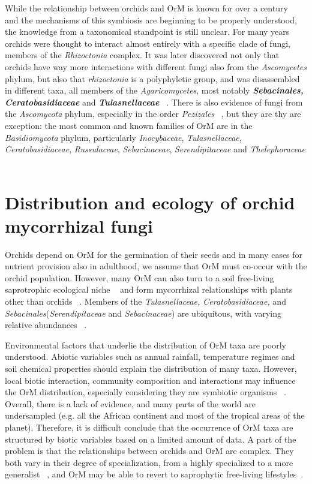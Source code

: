 While the relationship between orchids and OrM is known for over a century ~\citep{bernard1899, rayner1927, rasmussen2002, selosse2011} and the mechanisms of this symbiosis are beginning to be properly understood, the knowledge from a taxonomical standpoint is still unclear. For many years orchids were thought to interact almost entirely with a specific clade of fungi, members of the \emph{Rhizoctonia} complex. It was later discovered not only that orchids have way more interactions with different fungi also from the \emph{Ascomycetes} phylum, but also that \emph{rhizoctonia} is a polyphyletic group, and was disassembled in different taxa, all members of the \emph{Agaricomycetes}, most notably \textbf{\emph{Sebacinales, Ceratobasidiaceae}} and \textbf{\emph{Tulasnellaceae}} ~\citep{dearnaley2012}.
There is also evidence of fungi from the \emph{Ascomycota} phylum, especially in the order \emph{Pezizales} ~\citep{selosse2004, ouanphanivanh2008, waterman2011}, but they are thy are exception: the most common and known families of OrM are in the \emph{Basidiomycota} phylum, particularly \emph{Inocybaceae}, \emph{Tulasnellaceae}, \emph{Ceratobasidiaceae}, \emph{Russulaceae}, \emph{Sebacinaceae}, \emph{Serendipitaceae} and \emph{Thelephoraceae} ~\citep{taylor2004, roy2009, duffy2019}

\section{Distribution and ecology of orchid mycorrhizal fungi}
\label{distributionandecologyoforchidmycorrhizalfungi}

Orchids depend on OrM for the germination of their seeds and in many cases for nutrient provision also in adulthood, we assume that OrM must co-occur with the orchid population. However, many OrM can also turn to a soil free-living saprotrophic ecological niche ~\citep{oberwinkler2017} and form mycorrhizal relationships with plants other than orchids ~\citep{selosse2014}. Members of the \emph{Tulasnellaceae, Ceratobasidiaceae,} and \emph{Sebacinales}(\emph{Serendipitaceae} and \emph{Sebacinaceae}) are ubiquitous, with varying relative abundances ~\citep{jacquemyn2017}.

Environmental factors that underlie the distribution of OrM taxa are poorly understood. Abiotic variables such as annual rainfall, temperature regimes and soil chemical properties should explain the distribution of many taxa. However, local biotic interaction, community composition and interactions may influence the OrM distribution, especially considering they are symbiotic organisms ~\citep{jacquemyn2017}. Overall, there is a lack of evidence, and many parts of the world are undersampled (e.g. all the African continent and most of the tropical areas of the planet). Therefore, it is difficult conclude that the occurrence of OrM taxa are structured by biotic variables based on a limited amount of data. A part of the problem is that the relationships between orchids and OrM are complex. They both vary in their degree of specialization, from a highly specialized to a more generalist ~\citep{mccormick2004, girlanda2011, heijden2015}, and OrM may be able to revert to saprophytic free-living lifestyles~\citep{veldre2013}.

